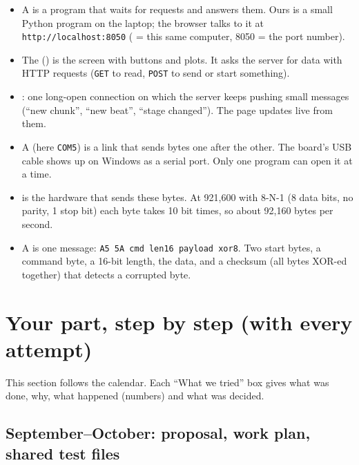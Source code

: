 \documentclass[11pt]{article}
\renewcommand{\file}[1]{\path{#1}}
\begin{document}
\begin{itemize}
  \item A  is a program that waits for requests and answers them. Ours is a small Python program on the laptop; the browser talks to it at \texttt{http://localhost:8050} ( = this same computer, 8050 = the port number).
  \item The  (\file{index.html}) is the screen with buttons and plots. It asks the server for data with HTTP requests (\texttt{GET} to read, \texttt{POST} to send or start something).
  \item {}: one long-open connection on which the server keeps pushing small messages (``new chunk'', ``new beat'', ``stage changed''). The page updates live from them.
  \item A  (here \texttt{COM5}) is a link that sends bytes one after the other. The board's USB cable shows up on Windows as a serial port. Only one program can open it at a time.
  \item {} is the hardware that sends these bytes. At 921,600  with 8-N-1 (8 data bits, no parity, 1 stop bit) each byte takes 10 bit times, so about 92,160 bytes per second.
  \item A  is one message: \texttt{A5 5A cmd len16 payload xor8}. Two start bytes, a command byte, a 16-bit length, the data, and a checksum (all bytes XOR-ed together) that detects a corrupted byte.
\end{itemize}

\section{Your part, step by step (with every attempt)}

This section follows the calendar. Each ``What we tried'' box gives what was done, why, what happened (numbers) and what was decided.

\subsection{September--October: proposal, work plan, shared test files}
\end{document}
